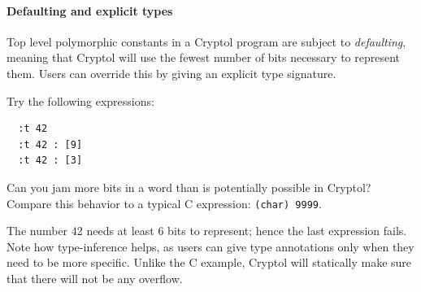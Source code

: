 \paragraph*{Defaulting and explicit types}\indDefaulting Top level
polymorphic constants in a Cryptol program are subject to
{\em defaulting}, meaning that Cryptol will use the fewest number of
bits necessary to represent them. Users can override this by giving an
explicit type signature.\indSignature

\begin{Exercise}\label{ex:words:3}
    Try the
  following expressions:
\begin{Verbatim}
  :t 42
  :t 42 : [9]
  :t 42 : [3]
\end{Verbatim}
Can you jam more bits in a word than is potentially possible in
Cryptol?  Compare this behavior to a typical C expression: {\tt (char)
  9999}.
\end{Exercise}
\begin{Answer}
  The number 42 needs at least 6 bits to represent; hence the last
  expression fails. Note how type-inference helps, as users can give
  type annotations only when they need to be more specific.  Unlike
  the C example, Cryptol will statically make sure that there will not
  be any overflow.
\end{Answer}

